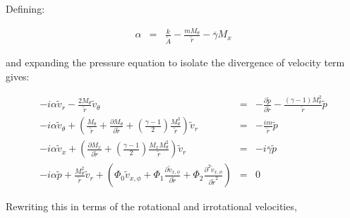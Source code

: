 Defining:

\begin{eqnarray}
\alpha &=&
 \frac{k}{ \widetilde{A}}
- \frac{ m M_{\theta} }{\widetilde{r}}
- \overline{\gamma} M_x  
\nonumber
\end{eqnarray}

and expanding the pressure equation to isolate the divergence
of velocity term gives:

\begin{small}
\begin{eqnarray}
-i \alpha \widetilde{v}_r 
-\frac{2 M_{\theta}}{\widetilde{r}} \widetilde{v}_{\theta} 
&=&
-
\frac{\partial \widetilde{p} }{\partial \widetilde{r}} 
-
\frac{\left(\gamma - 1 \right) M_{\theta}^2}{\widetilde{r}} \widetilde{p}
\nonumber
\\
-i
\alpha
 \widetilde{v}_{\theta} 
+
\left(
\frac{M_{\theta} }{\widetilde{r}}
+
\frac{\partial M_{\theta} }{\partial \widetilde{r}}
+
\left(\frac{\gamma - 1}{2} \right) \frac{M_{\theta}^3}{\widetilde{r}}
\right) 
\widetilde{v}_r
&=&
-\frac{i m }{\widetilde{r} } \widetilde{p}
\nonumber
\\
-i
\alpha
\widetilde{v}_x 
+
\left(
\frac{\partial M_x }{\partial \widetilde{r}} 
+
\left(\frac{\gamma - 1}{2} \right) \frac{M_x M_{\theta}^2}{\widetilde{r}}
\right)
\widetilde{v}_r
&=&
-i \overline{\gamma} \widetilde{p}
\nonumber
\\
-i
\alpha
 \widetilde{p}
+
\frac{M_{\theta}^2}{\widetilde{r}}
\widetilde{v}_r
+ 
\left(
\Phi_0 
\widetilde{v}_{x,\phi}
+\Phi_1 
\frac{\partial
\widetilde{v}_{x,\phi}
}{\partial \widetilde{r}} 
+\Phi_2 
\frac{\partial^2
\widetilde{v}_{x,\phi}
}{\partial \widetilde{r}^2} 
\right)
&=&
0
\nonumber
\end{eqnarray}
\end{small}%

Rewriting this in terms of the rotational and irrotational velocities,



